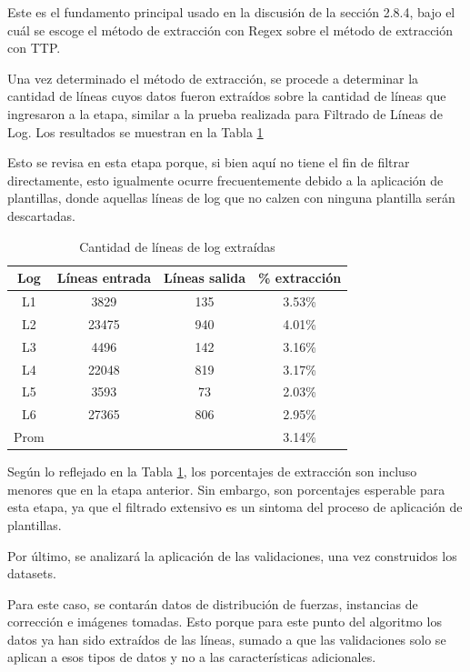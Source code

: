 Este es el fundamento principal usado en la discusión de la sección 2.8.4, bajo el cuál se escoge el método de extracción con Regex sobre el método de extracción con TTP.

Una vez determinado el método de extracción, se procede a determinar la cantidad de líneas cuyos datos fueron extraídos sobre la cantidad de líneas que ingresaron a la etapa, similar a la prueba realizada para Filtrado de Líneas de Log. Los resultados se muestran en la Tabla \ref{table:etapa2c2}

Esto se revisa en esta etapa porque, si bien aquí no tiene el fin de filtrar directamente, esto igualmente ocurre frecuentemente debido a la aplicación de plantillas, donde aquellas líneas de log que no calzen con ninguna plantilla serán descartadas.


\begin{table}[h]
    \centering
    \ttfamily
    \begin{tabular}{|c|c|c|c|}
        \hline
        Log & Líneas entrada & Líneas salida & \% extracción \\
        \hline \hline
        L1 & 3829 & 135 & 3.53\% \\
        \hline
        L2 & 23475 & 940 & 4.01\% \\
        \hline
        L3 & 4496 & 142 & 3.16\% \\
        \hline
        L4 & 22048 & 819 & 3.17\% \\
        \hline
        L5 & 3593 & 73 & 2.03\% \\
        \hline
        L6 & 27365 & 806 & 2.95\% \\
        \hline
        Prom &  &  & 3.14\% \\
        \hline
    \end{tabular}
    \caption{\label{table:etapa2c2} Cantidad de líneas de log extraídas}
\end{table}

Según lo reflejado en la Tabla \ref{table:etapa2c2}, los porcentajes de extracción son incluso menores que en la etapa anterior. Sin embargo, son porcentajes esperable para esta etapa, ya que el filtrado extensivo es un sintoma del proceso de aplicación de plantillas.

Por último, se analizará la aplicación de las validaciones, una vez construidos los datasets.

Para este caso, se contarán datos de distribución de fuerzas, instancias de corrección e imágenes tomadas. Esto porque para este punto del algoritmo los datos ya han sido extraídos de las líneas, sumado a que las validaciones solo se aplican a esos tipos de datos y no a las características adicionales.

